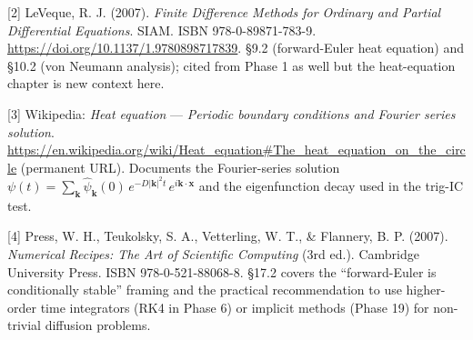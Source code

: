 {[}2{]} LeVeque, R. J. (2007). \emph{Finite Difference Methods for
Ordinary and Partial Differential Equations}. SIAM. ISBN
978-0-89871-783-9. \url{https://doi.org/10.1137/1.9780898717839}. §9.2
(forward-Euler heat equation) and §10.2 (von Neumann analysis); cited
from Phase 1 as well but the heat-equation chapter is new context here.

{[}3{]} Wikipedia: \emph{Heat equation} --- \emph{Periodic boundary
conditions and Fourier series solution}.
\url{https://en.wikipedia.org/wiki/Heat_equation\#The_heat_equation_on_the_circle}
(permanent URL). Documents the Fourier-series solution
\(\psi(t) = \sum_{\mathbf{k}} \hat\psi_{\mathbf{k}}(0)\,e^{-D|\mathbf{k}|^2 t}\,e^{i\mathbf{k}\cdot\mathbf{x}}\)
and the eigenfunction decay used in the trig-IC test.

{[}4{]} Press, W. H., Teukolsky, S. A., Vetterling, W. T., \& Flannery,
B. P. (2007). \emph{Numerical Recipes: The Art of Scientific Computing}
(3rd ed.). Cambridge University Press. ISBN 978-0-521-88068-8. §17.2
covers the ``forward-Euler is conditionally stable'' framing and the
practical recommendation to use higher-order time integrators (RK4 in
Phase 6) or implicit methods (Phase 19) for non-trivial diffusion
problems.
